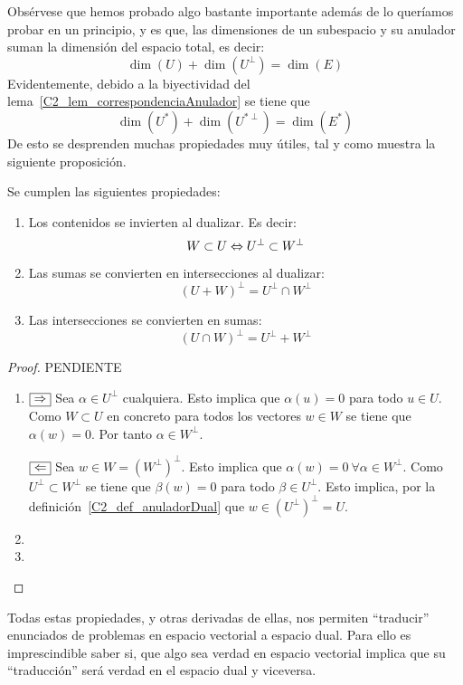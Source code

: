 Obsérvese que hemos probado algo bastante importante además de lo queríamos probar en un principio, y es que, las dimensiones de un subespacio y su anulador suman la dimensión del espacio total, es decir:
\begin{equation}\label{C2_eq_dim_anulador}
\dim(U)+\dim(U^{\perp})=\dim(E)
\end{equation}
Evidentemente, debido a la biyectividad del lema~\ref{C2_lem_correspondenciaAnulador} se tiene que
\begin{equation*}
\dim(U^*)+\dim(U^{*\perp})=\dim(E^*)
\end{equation*}
De esto se desprenden muchas propiedades muy útiles, tal y como muestra la siguiente proposición.
\begin{prop}
	\label{C2_pro_propiedades_dualidad}
	Se cumplen las siguientes propiedades:
	\begin{enumerate}
		\item Los contenidos se invierten al dualizar. Es decir: \[W\subset U\Leftrightarrow U^{\perp}\subset W^{\perp}\]
		\item Las sumas se convierten en intersecciones al dualizar:
		\[(U+W)^{\perp}=U^{\perp}\cap W^{\perp}\]
		\item Las intersecciones se convierten en sumas:
		\[(U\cap W)^{\perp}=U^{\perp}+ W^{\perp}\]
	\end{enumerate}
\end{prop}
\begin{proof} PENDIENTE
	\begin{enumerate}
		\item $\fbox{$\Rightarrow$}$ Sea $\alpha\in U^{\perp}$ cualquiera. Esto implica que $\alpha(u)=0$ para todo $u\in U$. Como $W\subset U$ en concreto para todos los vectores $w\in W$ se tiene que $\alpha(w)=0$. Por tanto $\alpha\in W^{\perp}$.
		
		$\fbox{$\Leftarrow$}$ Sea $w\in W=(W^{\perp})^{\perp}$. Esto implica que $\alpha(w)=0 \ \forall \alpha \in W^{\perp}$. Como $U^{\perp}\subset W^{\perp}$ se tiene que $\beta (w)=0$ para todo $\beta\in U^{\perp}$. Esto implica, por la definición~\ref{C2_def_anuladorDual} que $w\in (U^{\perp})^{\perp}=U$.
		
		
		\item 
		\item
	\end{enumerate}
\end{proof}
Todas estas propiedades, y otras derivadas de ellas, nos permiten ``traducir'' enunciados de problemas en espacio vectorial a espacio dual. Para ello es imprescindible saber si, que algo sea verdad en espacio vectorial implica que su ``traducción'' será verdad en el espacio dual y viceversa.

